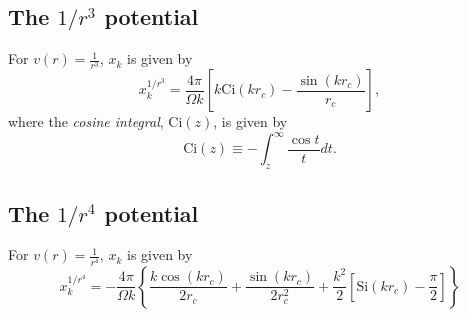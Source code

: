 \subsection*{The $1/r^3$ potential}
For $v(r) = \frac{1}{r^3}$, $x_k$ is given by
\begin{equation}
x_k^{1/r^3} = \frac{4\pi}{\Omega k} 
\left[k\text{Ci}(k r_c) - \frac{\sin(k r_c)}{r_c} \right],
\end{equation}
where the {\em cosine integral}, $\text{Ci}(z)$, is given by
\begin{equation}
\text{Ci}(z) \equiv -\int_z^\infty \frac{\cos t}{t} dt.
\end{equation}

\subsection*{The $1/r^4$ potential}
For $v(r) = \frac{1}{r^4}$, $x_k$ is given by
\begin{equation}
x_k^{1/r^4} = -\frac{4 \pi}{\Omega k} 
\left\{
\frac{k \cos(k r_c)}{2 r_c} + \frac{\sin(k r_c)}{2r_c^2} + \frac{k^2}{2} \left[ \text{Si}(k r_c) - \frac{\pi}{2}\right]\right\}
\end{equation}


